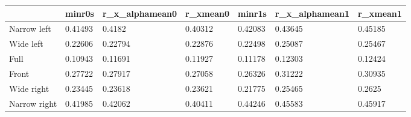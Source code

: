 \begin{tabular}{lllllll}
& minr0s & r_x_alphamean0 & r_xmean0 & minr1s & r_x_alphamean1 & r_xmean1 \\ 
\hline 
Narrow left & 0.41493 & 0.4182 & 0.40312 & 0.42083 & 0.43645 & 0.45185 \\ \hline 
Wide left & 0.22606 & 0.22794 & 0.22876 & 0.22498 & 0.25087 & 0.25467 \\ \hline 
Full & 0.10943 & 0.11691 & 0.11927 & 0.11178 & 0.12303 & 0.12424 \\ \hline 
Front & 0.27722 & 0.27917 & 0.27058 & 0.26326 & 0.31222 & 0.30935 \\ \hline 
Wide right & 0.23445 & 0.23618 & 0.23621 & 0.21775 & 0.25465 & 0.2625 \\ \hline 
Narrow right & 0.41985 & 0.42062 & 0.40411 & 0.44246 & 0.45583 & 0.45917 \\ \hline 
\hline 
\end{tabular}